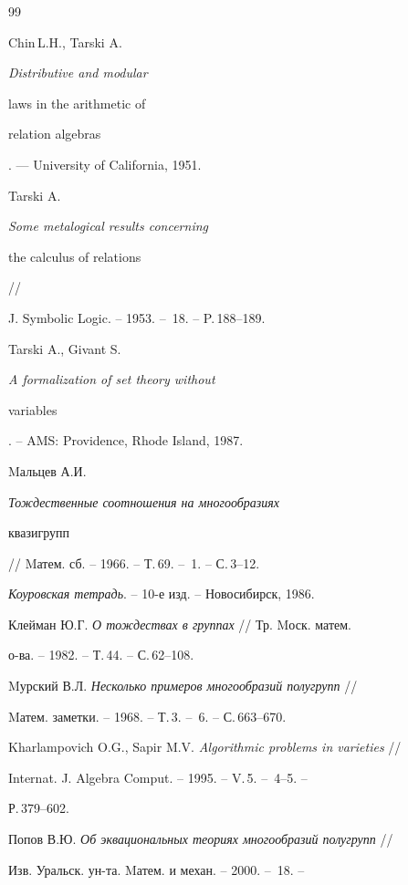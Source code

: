 \begin{thebibliography}{99} 


 




Chin\,L.H., Tarski A. {\em Distributive and modular 


laws in the arithmetic of 


relation algebras}. --- University of California, 1951. 




Tarski A. {\em Some metalogical results concerning 


the calculus of relations} // 


J. Symbolic Logic. -- 1953. -- \No\,18. -- P.\,188--189. 




Tarski A., Givant S. {\em A formalization of set theory without 


variables}. -- AMS: Providence, Rhode Island, 1987. 




Mальцев А.И. {\em Тождественные соотношения на многообразиях 


квазигрупп} // Mатем. сб. -- 1966. -- Т.\,69. -- \No\,1. -- С.\,3--12. 




{\em Коуровская тетрадь}. -- 10-е изд. -- Новосибирск, 1986. 




Клейман Ю.Г. {\em О тождествах в группах} // Тр. Mоск. матем. 


о-ва. -- 1982. -- Т.\,44. -- С.\,62--108. 




Mурский В.Л. {\em Несколько примеров многообразий полугрупп} // 


Mатем. заметки. -- 1968. -- Т.\,3. -- \No\,6. -- С.\,663--670. 




Kharlampovich O.G., Sapir M.V. {\em Algorithmic problems in varieties} // 


Internat. J. Algebra Comput. -- 1995. -- V.\,5. -- \No\,4--5. -- 


Р.\,379--602. 




Попов В.Ю. {\em Об эквациональных теориях многообразий полугрупп} // 


Изв. Уральск. ун-та. Mатем. и механ. -- 2000. -- \No\,18. -- 



\end{thebibliography}
